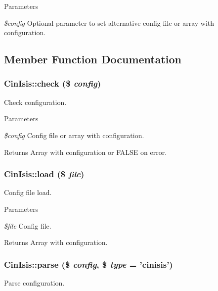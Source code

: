 \begin{DoxyParams}{Parameters}
\item[{\em \$config}]Optional parameter to set alternative config file or array with configuration. \end{DoxyParams}


\subsection{Member Function Documentation}
\hypertarget{classCinIsis_acd7e7486428fac5a0a85ad46b0486820}{
\subsubsection[{check}]{\setlength{\rightskip}{0pt plus 5cm}CinIsis::check (\$ {\em config})}}
\label{classCinIsis_acd7e7486428fac5a0a85ad46b0486820}
Check configuration.


\begin{DoxyParams}{Parameters}
\item[{\em \$config}]Config file or array with configuration.\end{DoxyParams}
\begin{DoxyReturn}{Returns}
Array with configuration or FALSE on error. 
\end{DoxyReturn}
\hypertarget{classCinIsis_a831607c2fe9ffac63be8de42e1c9dbae}{
\subsubsection[{load}]{\setlength{\rightskip}{0pt plus 5cm}CinIsis::load (\$ {\em file})}}
\label{classCinIsis_a831607c2fe9ffac63be8de42e1c9dbae}
Config file load.


\begin{DoxyParams}{Parameters}
\item[{\em \$file}]Config file.\end{DoxyParams}
\begin{DoxyReturn}{Returns}
Array with configuration. 
\end{DoxyReturn}
\hypertarget{classCinIsis_afa9cbac9e165ebed194b24487344d2fb}{
\subsubsection[{parse}]{\setlength{\rightskip}{0pt plus 5cm}CinIsis::parse (\$ {\em config}, \/  \$ {\em type} = {\ttfamily 'cinisis'})}}
\label{classCinIsis_afa9cbac9e165ebed194b24487344d2fb}
Parse configuration.


